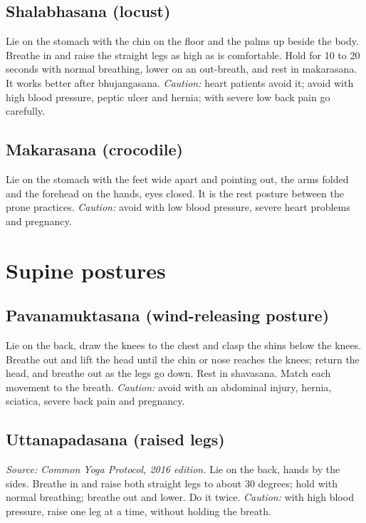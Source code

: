 \subsection*{Shalabhasana (locust)}
Lie on the stomach with the chin on the floor and the palms up beside the body. Breathe in and raise the straight legs as high as is comfortable. Hold for 10 to 20 seconds with normal breathing, lower on an out-breath, and rest in makarasana. It works better after bhujangasana.
\textit{Caution:} heart patients avoid it; avoid with high blood pressure, peptic ulcer and hernia; with severe low back pain go carefully.

\subsection*{Makarasana (crocodile)}
Lie on the stomach with the feet wide apart and pointing out, the arms folded and the forehead on the hands, eyes closed. It is the rest posture between the prone practices.
\textit{Caution:} avoid with low blood pressure, severe heart problems and pregnancy.

\section{Supine postures}

\subsection*{Pavanamuktasana (wind-releasing posture)}
Lie on the back, draw the knees to the chest and clasp the shins below the knees. Breathe out and lift the head until the chin or nose reaches the knees; return the head, and breathe out as the legs go down. Rest in shavasana. Match each movement to the breath.
\textit{Caution:} avoid with an abdominal injury, hernia, sciatica, severe back pain and pregnancy.

\subsection*{Uttanapadasana (raised legs)}
\textit{Source: Common Yoga Protocol, 2016 edition.} Lie on the back, hands by the sides. Breathe in and raise both straight legs to about 30 degrees; hold with normal breathing; breathe out and lower. Do it twice.
\textit{Caution:} with high blood pressure, raise one leg at a time, without holding the breath.


